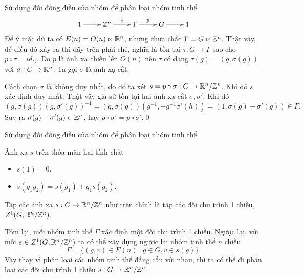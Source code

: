 \begin{frame}{Sử dụng đối đồng điều của nhóm để phân loại nhóm tinh thể}
    $$
    \xymatrix{
        1 \ar[r] & \Z^n \ar[r]^-{i} & \Gamma \ar[r]^-{p} & G \ar[r] & 1
    }
    $$
    Để ý mặc dù ta có $E(n) = O(n) \ltimes \mathbb R^n$, nhưng chưa chắc $\Gamma = G \ltimes \mathbb Z^n$. Thật vậy, để điều đó xảy ra thì dãy trên phải chẻ, nghĩa là tồn tại $\tau: G \rightarrow \Gamma$ sao cho $p \circ \tau = id_{G}$. Do $p$ là ánh xạ chiếu lên $O(n)$ nên $\tau$ có dạng $\tau(g) = (g, \sigma(g))$ với $\sigma: G \rightarrow \mathbb R^n$. Ta gọi $\sigma$ là ánh xạ cắt.

    Cách chọn $\sigma$ là không duy nhất, do đó ta xét $s = p \circ \sigma: G \rightarrow \mathbb R^n / \mathbb Z^n$. Khi đó $s$ xác định duy nhất. Thật vậy giả sử tồn tại hai ánh xạ cắt $\sigma, \sigma'$. Khi đó
    $$
        (g, \sigma(g))(g, \sigma'(g))^{-1} = (g, \sigma(g))(g^{-1}, -g^{-1} \sigma'(h)) = (1, \sigma(g) - \sigma'(g)) \in \Gamma.
    $$
    Suy ra $\sigma(g) - \sigma'(g) \in \mathbb Z^n$, hay $p \circ \sigma' = p \circ \sigma'$.\qed
\end{frame}

\begin{frame}{Sử dụng đối đồng điều của nhóm để phân loại nhóm tinh thể}
    \begin{proposition}
        Ánh xạ $s$ trên thỏa mãn hai tính chất
        \begin{itemize}
            \item $s(1) = 0$.
            \item $s(g_1g_2) = s(g_1) + g_1s(g_2)$.
        \end{itemize}
    \end{proposition}

    \begin{corollary1}
        Tập các ánh xạ $s: G \rightarrow \mathbb R^n / \mathbb Z^n$ như trên chính là tập các đối chu trình 1 chiều, $Z^1(G, \mathbb R^n / \mathbb Z^n)$. 
    \end{corollary1}

    Tóm lại, mỗi nhóm tinh thể $\Gamma$ xác định một đối chu trình 1 chiều. Ngược lại, với mỗi $s \in Z^1(G, \mathbb R^n / \mathbb Z^n)$ ta có thể xây dựng ngược lại nhóm tinh thể $n$ chiều
    $$
        \Gamma = \{ (g, v) \in E(n)\ |\ g \in G, v \in s(g) \}.
    $$
    Vậy thay vì phân loại các nhóm tinh thể đẳng cấu với nhau, thì ta có thể đi phân loại các đối chu trình 1 chiều $s: G \rightarrow \mathbb R^n / \mathbb Z^n$.
\end{frame}

